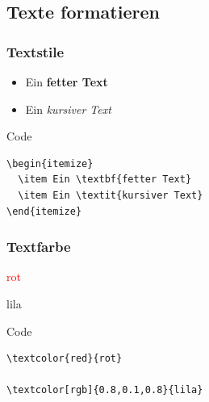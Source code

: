 \subsection{Texte formatieren}

\begin{frame}[fragile]
	\frametitle{Textstile}

	\begin{example}
		\begin{itemize}[<+->]
			\item Ein \textbf{fetter Text}
			\item Ein \textit{kursiver Text}
		\end{itemize}
	\end{example}
  \pause
  \begin{block}{Code}
    \begin{verbatim}
\begin{itemize}
  \item Ein \textbf{fetter Text}
  \item Ein \textit{kursiver Text}
\end{itemize}
    \end{verbatim}
  \end{block}
\end{frame}

\begin{frame}[fragile]
  \frametitle{Textfarbe}

  \begin{example}
    \textcolor{red}{rot}

    \textcolor[rgb]{0.8,0.1,0.8}{lila}
  \end{example}
  \pause
  \begin{block}{Code}
    \begin{verbatim}
\textcolor{red}{rot}

\textcolor[rgb]{0.8,0.1,0.8}{lila}
    \end{verbatim}
  \end{block}
\end{frame}



